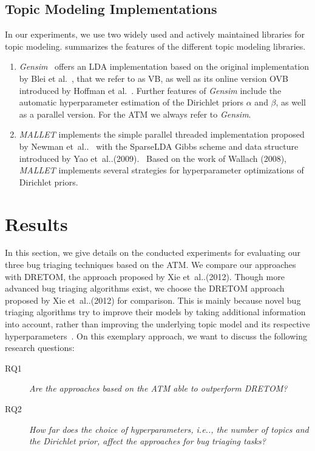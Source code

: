 \documentclass[a4paper,twoside]{article}
\makeatletter
\DeclareRobustCommand\onedot{\futurelet\@let@token\@onedot}
\def\@onedot{\ifx\@let@token.\else.\null\fi\xspace}
\def\etal{et~al\onedot}
\def\ie{i.e\onedot,\xspace}
\makeatother
\begin{document}
\subsection{Topic Modeling Implementations}

In our experiments, we use two widely used and actively maintained libraries for topic modeling.  summarizes the features of the different topic modeling libraries.
\begin{enumerate}
    \item \textit{Gensim}~\cite{Rehurek2010Gensim} offers an \ac{LDA} implementation based on the original implementation by Blei et al.~\cite{blei2003latent}, that we refer to as \ac{VB}, as well as its online version \ac{OVB} introduced by Hoffman et al.~\cite{Hoffman2010OnlineLDA}.
    Further features of \textit{Gensim} include the automatic hyperparameter estimation of the Dirichlet priors $\alpha$ and $\beta$, as well as a parallel version.
    For the \ac{ATM} we always refer to \textit{Gensim}.
    
    \item \textit{MALLET} implements the simple parallel threaded implementation proposed by Newman \etal~\cite{Newman2009DistributedModels}
    with the SparseLDA Gibbs scheme and data structure introduced by Yao \etal (2009).~\nocite{Yao2009EfficientCollections}
    Based on the work of Wallach (2008),
    \textit{MALLET} implements several strategies for hyperparameter optimizations of Dirichlet priors.~\nocite{Wallach2008StructuredLanguage}
\end{enumerate}

\section{Results}
\label{section: results}

In this section, we give details on the conducted experiments for evaluating our three bug triaging techniques based on the \ac{ATM}.
We compare our approaches with \ac{DRETOM}, the approach proposed by Xie \etal (2012).
Though more advanced bug triaging algorithms exist, we choose the \ac{DRETOM} approach proposed by Xie \etal (2012) for comparison.
This is mainly because novel bug triaging algorithms try to improve their models by taking additional information into account, rather than improving the underlying topic model and its respective hyperparameters~\cite{xia2013accurate,naguib2013bug,zhang2014novel,yang2014towards,nguyen2014topic,zhang2016towards,xia2016improving,zhang2014butter}.
On this exemplary approach, we want to discuss the following research questions:
\begin{description}
    \item[RQ1] \textsl{Are the approaches based on the \ac{ATM} able to outperform \ac{DRETOM}?}
\end{description}
\begin{description}
    \item[RQ2] \textsl{How far does the choice of hyperparameters, \ie the number of topics and the Dirichlet prior, affect the approaches for bug triaging tasks?}
\end{description}
\end{document}
